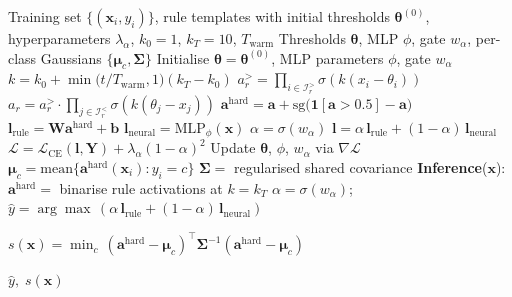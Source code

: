 \documentclass[journal]{IEEEtran}
\begin{document}
\begin{algorithm}[!ht]
\caption{NeSy-NIDS Training and OOD Scoring}
\label{alg:nesy}
\begin{algorithmic}[1]
\footnotesize
\Require Training set $\{(\mathbf{x}_i, y_i)\}$, rule templates with
         initial thresholds $\boldsymbol{\theta}^{(0)}$,
         hyperparameters $\lambda_\alpha$,
         $k_0{=}1$, $k_T{=}10$, $T_{\mathrm{warm}}$
\Ensure  Thresholds $\boldsymbol{\theta}$, MLP $\phi$, gate $w_\alpha$,
         per-class Gaussians $\{\boldsymbol{\mu}_c, \boldsymbol{\Sigma}\}$
\State Initialise $\boldsymbol{\theta} = \boldsymbol{\theta}^{(0)}$,
       MLP parameters $\phi$, gate $w_\alpha$
  \State $k = k_0 + \min\!\bigl(t/T_{\mathrm{warm}},1\bigr)(k_T - k_0)$
      \State $a_r^{>} = \prod_{i\in\mathcal{I}_r^{>}}\!\sigma(k(x_i{-}\theta_i))$
      \State $a_r = a_r^{>} \cdot \prod_{j\in\mathcal{I}_r^{<}}\!\sigma(k(\theta_j{-}x_j))$
    \EndFor
    \State $\mathbf{a}^{\!\mathrm{hard}} = \mathbf{a}
           + \mathrm{sg}\!\bigl(\mathbf{1}[\mathbf{a}{>}0.5]-\mathbf{a}\bigr)$
    \State $\mathbf{l}_{\mathrm{rule}} = \mathbf{W}\mathbf{a}^{\mathrm{hard}}\!+\!\mathbf{b}$
    \State $\mathbf{l}_{\mathrm{neural}} = \mathrm{MLP}_\phi(\mathbf{x})$
    \State $\alpha = \sigma(w_\alpha)$
    \State $\mathbf{l} = \alpha\,\mathbf{l}_{\mathrm{rule}} + (1{-}\alpha)\,\mathbf{l}_{\mathrm{neural}}$
    \State $\mathcal{L} = \mathcal{L}_{\mathrm{CE}}(\mathbf{l},\mathbf{Y}) + \lambda_\alpha(1{-}\alpha)^2$
    \State Update $\boldsymbol{\theta}$, $\phi$, $w_\alpha$ via $\nabla\mathcal{L}$
  \EndFor
\EndFor
{} 
  \State $\boldsymbol{\mu}_c = \mathrm{mean}\{\mathbf{a}^{\mathrm{hard}}(\mathbf{x}_i) : y_i = c\}$
\EndFor
\State $\boldsymbol{\Sigma} = $ regularised shared covariance
\Statex
\Statex \textbf{Inference}($\mathbf{x}$):
\State $\mathbf{a}^{\mathrm{hard}} = $ binarise rule activations at $k{=}k_T$
\State $\alpha = \sigma(w_\alpha)$;\quad
       $\hat{y} = \arg\max\,(\alpha\,\mathbf{l}_{\mathrm{rule}} + (1{-}\alpha)\,\mathbf{l}_{\mathrm{neural}})$
\State \parbox[t]{\dimexpr\linewidth-\algorithmicindent}{%
  $s(\mathbf{x}) = \min_c\,(\mathbf{a}^{\mathrm{hard}}-\boldsymbol{\mu}_c)^\top
  \boldsymbol{\Sigma}^{-1}(\mathbf{a}^{\mathrm{hard}}-\boldsymbol{\mu}_c)$
  \hfill{}}
\State \Return $\hat{y},\; s(\mathbf{x})$
\end{algorithmic}
\end{algorithm}
\end{document}
